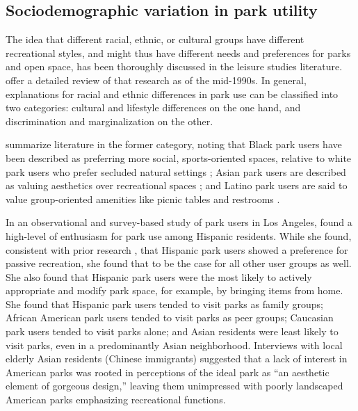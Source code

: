 \documentclass[3p, authoryear, review]{elsarticle} %
\begin{document}
\hypertarget{sociodemographic-variation-in-park-utility}{%
\subsection{Sociodemographic variation in park utility}\label{sociodemographic-variation-in-park-utility}}

The idea that different racial, ethnic, or cultural groups have different
recreational styles, and might thus have different needs and preferences for
parks and open space, has been thoroughly discussed in the leisure studies
literature. \citet{husbands1995ethnicity} offer a detailed review of that research as
of the mid-1990s. In general, explanations for racial and ethnic differences in
park use can be classified into two categories: cultural and lifestyle
differences on the one hand, and discrimination and marginalization on the
other.

\citet{byrne2009nature} summarize literature in the former category, noting that Black
park users have been described as preferring more social, sports-oriented
spaces, relative to white park users who prefer secluded natural settings
\citep{washburne1978black, hutchison1987ethnicity, floyd1999convergence, gobster2002managing, payne2002examination, ho2005gender}; Asian park users
are described as valuing aesthetics over recreational spaces
\citep{gobster2002managing, payne2002examination, ho2005gender}; and Latino park
users are said to value group-oriented amenities like picnic tables and
restrooms \citep{baas1993influence, hutchison1987ethnicity, irwin1990mexican}.

In an observational and survey-based study of park users in Los Angeles,
\citet{loukaitou1995urban} found a high-level of enthusiasm for park use among Hispanic
residents. While she found, consistent with prior research
\citep{baas1993influence, hutchison1987ethnicity, irwin1990mexican}, that
Hispanic park users showed a preference for passive recreation, she found that
to be the case for all other user groups as well. She also found that Hispanic
park users were the most likely to actively appropriate and modify park space,
for example, by bringing items from home. She found that Hispanic park users
tended to visit parks as family groups; African American park users tended to
visit parks as peer groups; Caucasian park users tended to visit parks alone;
and Asian residents were least likely to visit parks, even in a predominantly
Asian neighborhood. Interviews with local elderly Asian residents (Chinese
immigrants) suggested that a lack of interest in American parks was rooted in
perceptions of the ideal park as ``an aesthetic element of gorgeous design,''
leaving them unimpressed with poorly landscaped American parks emphasizing
recreational functions.
\end{document}
